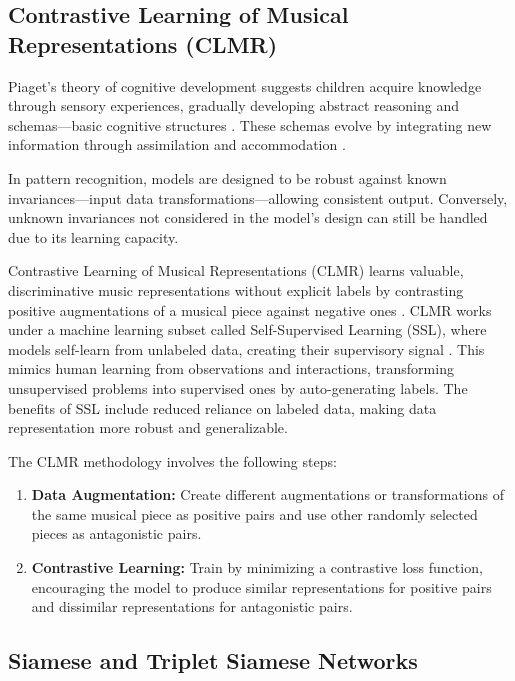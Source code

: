 \subsection{Contrastive Learning of Musical Representations (CLMR)}

Piaget's theory of cognitive development suggests children acquire knowledge through sensory experiences, gradually developing abstract reasoning and schemas—basic cognitive structures \cite{Huitt2003PiagetsDevelopment}. These schemas evolve by integrating new information through assimilation and accommodation \cite{audioselfsupsurvey}.

In pattern recognition, models are designed to be robust against known invariances—input data transformations—allowing consistent output. Conversely, unknown invariances not considered in the model's design can still be handled due to its learning capacity.

Contrastive Learning of Musical Representations (CLMR) learns valuable, discriminative music representations without explicit labels by contrasting positive augmentations of a musical piece against negative ones \cite{CLMR2021}. CLMR works under a machine learning subset called Self-Supervised Learning (SSL), where models self-learn from unlabeled data, creating their supervisory signal \cite{audioselfsupsurvey}. This mimics human learning from observations and interactions, transforming unsupervised problems into supervised ones by auto-generating labels. The benefits of SSL include reduced reliance on labeled data, making data representation more robust and generalizable.

The CLMR methodology involves the following steps:

\begin{enumerate}
\item \textbf{Data Augmentation:} Create different augmentations or transformations of the same musical piece as positive pairs and use other randomly selected pieces as antagonistic pairs.
\item \textbf{Contrastive Learning:} Train by minimizing a contrastive loss function, encouraging the model to produce similar representations for positive pairs and dissimilar representations for antagonistic pairs.
\end{enumerate}


\subsection{Siamese and Triplet Siamese Networks}

